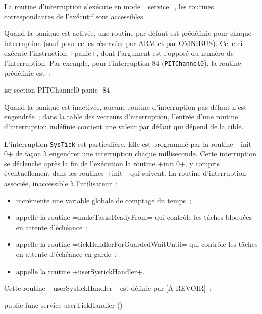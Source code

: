 La routine d'interruption s'exécute en mode \omnibus=service=, les routines correspondantes de l'exécutif sont accessibles.








Quand la panique est activée, une routine par défaut est prédéfinie pour chaque interruption (sauf pour celles réservées par ARM et par OMNIBUS). Celle-ci exécute l'instruction \omnibus+panic+, dont l'argument est l'opposé du numéro de l'interruption. Par exemple, pour l'interruption $84$ (\texttt{PITChannel0}), la routine prédéfinie est~:

\begin{OMNIBUS}
isr section PITChannel0 {
  panic -84
}
\end{OMNIBUS}



Quand la panique est inactivée, aucune routine d'interruption pas défaut n'est engendrée~; dans la table des vecteurs d'interruption, l'entrée d'une routine d'interruption indéfinie contient une valeur par défaut qui dépend de la cible.






L'interruption \texttt{SysTick} est particulière. Elle est programmé par la routine \omnibus+init 0+ de façon à engendrer une interruption chaque milliseconde. Cette interruption se déclenche après la fin de l'exécution la routine \omnibus+init 0+, y compris éventuellement dans les routines \omnibus+init+ qui suivent. La routine d'interruption associée, inaccessible à l'utilisateur~:
\begin{itemize}
  \item incrémente une variable globale de comptage du temps~;
  \item appelle la routine \omnibus=makeTasksReadyFrom= qui contrôle les tâches bloquées en attente d'échéance~;
  \item appelle la routine \omnibus=tickHandlerForGuardedWaitUntil= qui contrôle les tâches en attente d'échéance en garde~;
  \item appelle la routine \omnibus+userSystickHandler+.
\end{itemize}

Cette routine \omnibus+userSystickHandler+ est définie par [À REVOIR]~:

\begin{OMNIBUS}
public func service userTickHandler () {
}
\end{OMNIBUS}




